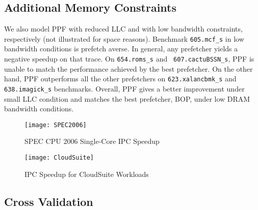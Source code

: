 \subsection{Additional Memory Constraints}
\label{Results-AdditionalMem}


We also model PPF with reduced LLC and with low bandwidth constraints,
respectively (not illustrated for space reasons). Benchmark {\tt 605.mcf\_s}
in low bandwidth conditions is prefetch averse. In general, any prefetcher
yields a negative speedup on that trace. On {\tt 654.roms\_s} and {\tt
607.cactuBSSN\_s}, PPF is unable to match the performance achieved by the best
prefetcher. On the other hand, PPF outperforms all the other prefetchers on
{\tt 623.xalancbmk\_s} and {\tt 638.imagick\_s} benchmarks. Overall, PPF
gives a better improvement under small LLC condition and matches the best
prefetcher, BOP, under low DRAM bandwidth conditions.

\begin{figure}[ht]
\texttt{[image: SPEC2006]}
\caption{SPEC CPU 2006 Single-Core IPC Speedup}
\label{Fig:SPEC2006_1core}
\end{figure}

\begin{figure}[ht]
\texttt{[image: CloudSuite]}
\caption{IPC Speedup for CloudSuite Workloads}
\label{Fig:CloudSuite}
\end{figure}


\subsection{Cross Validation}
\label{Results-CrossVal}

